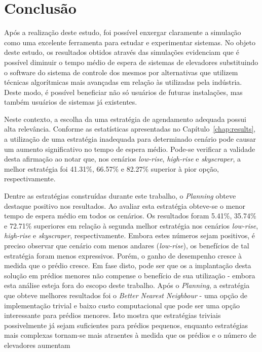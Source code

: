 \chapter{\label{chap:conclusion}Conclusão}

Após a realização deste estudo, foi possível enxergar claramente a simulação
como uma excelente ferramenta para estudar e experimentar sistemas. No objeto
deste estudo, os resultados obtidos através das simulações evidenciam que é
possível diminuir o tempo médio de espera de sistemas de elevadores substituindo
o software do sistema de controle dos mesmos por alternativas que utilizem
técnicas algorítmicas mais avançadas em relação às utilizadas pela indústria.
Deste modo, é possível beneficiar não só usuários de futuras instalações, mas
também usuários de sistemas já existentes.

Neste contexto, a escolha da uma estratégia de agendamento adequada possui alta
relevância. Conforme as estatísticas apresentadas no
Capítulo~\ref{chap:results}, a utilização de uma estratégia inadequada para
determinado cenário pode causar um aumento significativo no tempo de espera
médio. Pode-se verificar a validade desta afirmação ao notar que, nos cenários
\textit{low-rise}, \textit{high-rise} e \textit{skyscraper}, a melhor estratégia
foi 41.31\%, 66.57\% e 82.27\% superior à pior opção, respectivamente.

Dentre as estratégias construídas durante este trabalho, o \textit{Planning}
obteve destaque positivo nos resultados. Ao avaliar esta estratégia obteve-se o
menor tempo de espera médio em todos os cenários. Os resultados foram 5.41\%,
35.74\% e 72.71\% superiores em relação à segunda melhor estratégia nos cenários
\textit{low-rise}, \textit{high-rise} e \textit{skyscraper}, respectivamente.
Embora estes números sejam positivos, é preciso observar que cenário com menos
andares (\textit{low-rise}), os benefícios de tal estratégia foram menos
expressivos. Porém, o ganho de desempenho cresce à medida que o prédio cresce.
Em fase disto, pode ser que os a implantação desta solução em prédios menores
não compense o benefício de sua utilização - embora esta análise esteja fora do
escopo deste trabalho. Após o \textit{Planning}, a estratégia que obteve
melhores resultados foi o \textit{Better Nearest Neighbour} - uma opção de
implementação trivial e baixo custo computacional que pode ser uma opção
interessante para prédios menores. Isto mostra que estratégias triviais
possivelmente já sejam suficientes para prédios pequenos, enquanto estratégias
mais complexas tornam-se mais atraentes à medida que os prédios e o número de
elevadores aumentam

